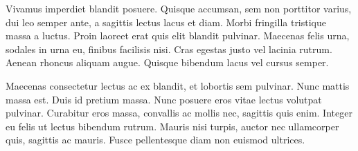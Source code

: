 Vivamus imperdiet blandit posuere. Quisque accumsan, sem non porttitor varius, dui leo semper ante, a sagittis lectus lacus et diam. Morbi fringilla tristique massa a luctus. Proin laoreet erat quis elit blandit pulvinar. Maecenas felis urna, sodales in urna eu, finibus facilisis nisi. Cras egestas justo vel lacinia rutrum. Aenean rhoncus aliquam augue. Quisque bibendum lacus vel cursus semper.

Maecenas consectetur lectus ac ex blandit, et lobortis sem pulvinar. Nunc mattis massa est. Duis id pretium massa. Nunc posuere eros vitae lectus volutpat pulvinar. Curabitur eros massa, convallis ac mollis nec, sagittis quis enim. Integer eu felis ut lectus bibendum rutrum. Mauris nisi turpis, auctor nec ullamcorper quis, sagittis ac mauris. Fusce pellentesque diam non euismod ultrices.